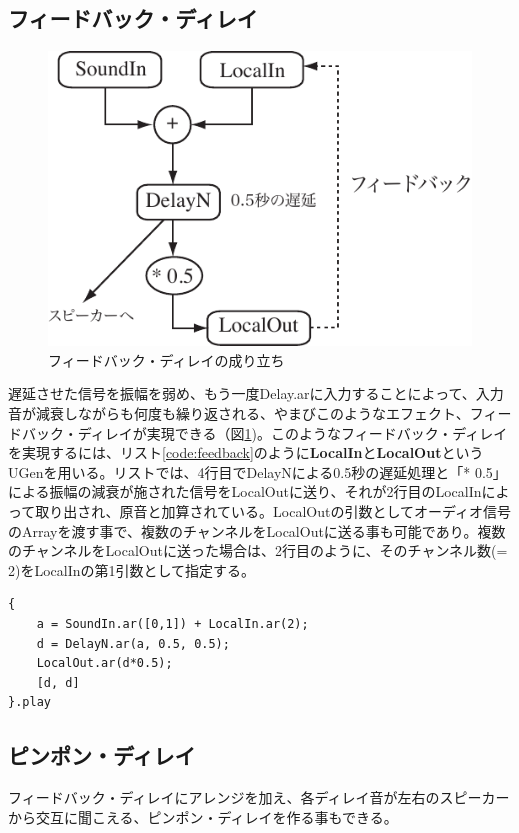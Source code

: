 \documentclass{jsarticle}
\begin{document}
\subsection{フィードバック・ディレイ}
\begin{figure}[htbp]
	\begin{center}
		\includegraphics[scale=0.7]{feedback.pdf}
	\end{center}
	\caption{フィードバック・ディレイの成り立ち}
	\label{fig:feedback}
\end{figure}

遅延させた信号を振幅を弱め、もう一度Delay.arに入力することによって、入力音が減衰しながらも何度も繰り返される、やまびこのようなエフェクト、フィードバック・ディレイが実現できる（図\ref{fig:feedback})。このようなフィードバック・ディレイを実現するには、リスト\ref{code:feedback}のように{\bf LocalIn}と{\bf LocalOut}というUGenを用いる。リストでは、4行目でDelayNによる0.5秒の遅延処理と「* 0.5」による振幅の減衰が施された信号をLocalOutに送り、それが2行目のLocalInによって取り出され、原音と加算されている。LocalOutの引数としてオーディオ信号のArrayを渡す事で、複数のチャンネルをLocalOutに送る事も可能であり。複数のチャンネルをLocalOutに送った場合は、2行目のように、そのチャンネル数(= 2)をLocalInの第1引数として指定する。

\begin{lstlisting}[caption=フィードバック・ディレイ, label=code:feedback]
{
	a = SoundIn.ar([0,1]) + LocalIn.ar(2);
	d = DelayN.ar(a, 0.5, 0.5);
	LocalOut.ar(d*0.5);
	[d, d]
}.play
\end{lstlisting}

\subsection{ピンポン・ディレイ}
フィードバック・ディレイにアレンジを加え、各ディレイ音が左右のスピーカーから交互に聞こえる、ピンポン・ディレイを作る事もできる。
\end{document}
